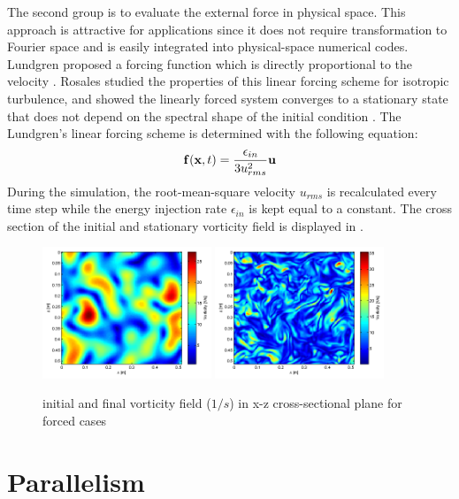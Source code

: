 The second group is to evaluate the external force in physical space. This approach is attractive for applications since it does not require transformation to Fourier space and is easily integrated into physical-space numerical codes. Lundgren proposed a forcing function which is directly proportional to the velocity \cite{Lundgren2003Linearly}. Rosales studied the properties of this linear forcing scheme for isotropic turbulence, and showed the linearly forced system converges to a stationary state that does not depend on the spectral shape of the initial condition \cite{Rosales2005Linear}. The Lundgren's linear forcing scheme is determined with the following equation:
\begin{equation}
\mathbf{f}(\mathbf{x}, t) = \frac{\epsilon_{in}}{3u_{rms}^2}\mathbf{u}
\end{equation}
During the simulation, the root-mean-square velocity $u_{rms}$ is recalculated every time step while the energy injection rate $\epsilon_{in}$ is kept equal to a constant.
The cross section of the initial and stationary vorticity field is displayed in .

\begin{figure}[!htbp]\centering
\includegraphics[width=0.45\textwidth]{Figures/vortex-0}
\includegraphics[width=0.45\textwidth]{Figures/vortex-1}

\caption{initial and final vorticity field ($1/s$) in x-z cross-sectional
plane for forced cases\label{fig:vort}}
\end{figure}

\section{Parallelism}
